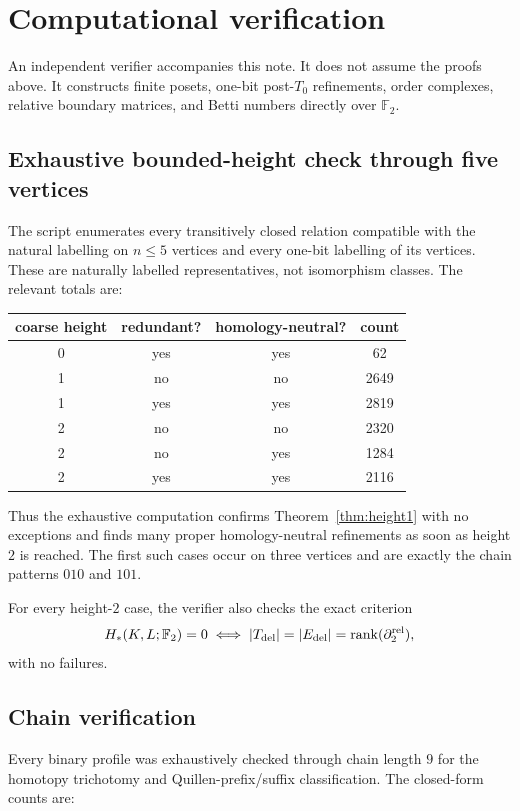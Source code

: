\documentclass[11pt]{article}
\theoremstyle{definition}
\newcommand{\F}{\mathbb F_2}
\newcommand{\rank}{\operatorname{rank}}
\begin{document}
\section{Computational verification}

An independent verifier accompanies this note. It does not assume the proofs above. It constructs finite posets, one-bit post-$T_0$ refinements, order complexes, relative boundary matrices, and Betti numbers directly over $\F$.

\subsection{Exhaustive bounded-height check through five vertices}

The script enumerates every transitively closed relation compatible with the natural labelling on $n\le5$ vertices and every one-bit labelling of its vertices. These are naturally labelled representatives, not isomorphism classes. The relevant totals are:

\begin{center}
\begin{tabular}{cccc}
\toprule
coarse height & redundant? & homology-neutral? & count \\
\midrule
0 & yes & yes & 62 \\
1 & no & no & 2649 \\
1 & yes & yes & 2819 \\
2 & no & no & 2320 \\
2 & no & yes & 1284 \\
2 & yes & yes & 2116 \\
\bottomrule
\end{tabular}
\end{center}

Thus the exhaustive computation confirms Theorem~\ref{thm:height1} with no exceptions and finds many proper homology-neutral refinements as soon as height $2$ is reached. The first such cases occur on three vertices and are exactly the chain patterns $010$ and $101$.

For every height-$2$ case, the verifier also checks the exact criterion
\[
H_*(K,L;\F)=0
\iff
|T_{\rm del}|=|E_{\rm del}|=\rank(\partial_2^{\rm rel}),
\]
with no failures.

\subsection{Chain verification}

Every binary profile was exhaustively checked through chain length $9$ for the homotopy trichotomy and Quillen-prefix/suffix classification. The closed-form counts are:
\end{document}
